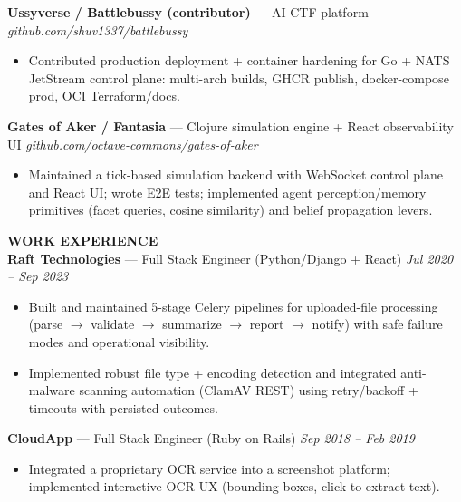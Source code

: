 \documentclass[10pt]{article}
\begin{document}
\textbf{Ussyverse / Battlebussy (contributor)} --- AI CTF platform \hfill \textit{github.com/shuv1337/battlebussy}\\
\vspace{-6pt}
\begin{itemize}
  \setlength\itemsep{-2pt}
  \setlength\parskip{0pt}
  \setlength\parsep{0pt}
  \item Contributed production deployment + container hardening for Go + NATS JetStream control plane: multi-arch builds, GHCR publish, docker-compose prod, OCI Terraform/docs.
\end{itemize}

\textbf{Gates of Aker / Fantasia} --- Clojure simulation engine + React observability UI \hfill \textit{github.com/octave-commons/gates-of-aker}\\
\vspace{-6pt}
\begin{itemize}
  \setlength\itemsep{-2pt}
  \setlength\parskip{0pt}
  \setlength\parsep{0pt}
  \item Maintained a tick-based simulation backend with WebSocket control plane and React UI; wrote E2E tests; implemented agent perception/memory primitives (facet queries, cosine similarity) and belief propagation levers.
\end{itemize}

\vspace{4pt}
\textbf{WORK EXPERIENCE}\\

\textbf{Raft Technologies} --- Full Stack Engineer (Python/Django + React) \hfill \textit{Jul 2020 -- Sep 2023}\\
\vspace{-6pt}
\begin{itemize}
  \setlength\itemsep{-2pt}
  \setlength\parskip{0pt}
  \setlength\parsep{0pt}
  \item Built and maintained 5-stage Celery pipelines for uploaded-file processing (parse $\rightarrow$ validate $\rightarrow$ summarize $\rightarrow$ report $\rightarrow$ notify) with safe failure modes and operational visibility.
  \item Implemented robust file type + encoding detection and integrated anti-malware scanning automation (ClamAV REST) using retry/backoff + timeouts with persisted outcomes.
\end{itemize}

\textbf{CloudApp} --- Full Stack Engineer (Ruby on Rails) \hfill \textit{Sep 2018 -- Feb 2019}\\
\vspace{-6pt}
\begin{itemize}
  \setlength\itemsep{-2pt}
  \setlength\parskip{0pt}
  \setlength\parsep{0pt}
  \item Integrated a proprietary OCR service into a screenshot platform; implemented interactive OCR UX (bounding boxes, click-to-extract text).
\end{itemize}
\end{document}
